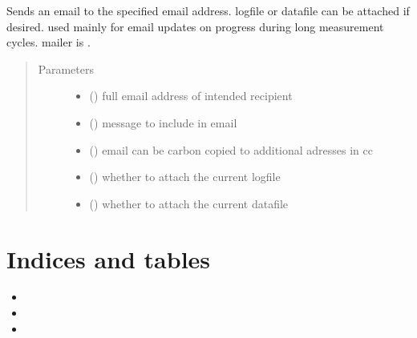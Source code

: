 \documentclass[letterpaper,10pt,english]{sphinxmanual}
\begin{document}
\begin{fulllineitems}
\label{\detokenize{utils:utils.send_email}}
Sends an email to the specified email address. logfile or datafile can
be attached if desired. used mainly for email updates on progress during
long measurement cycles. mailer is .
\begin{quote}\begin{description}
\item[{Parameters}] \leavevmode\begin{itemize}
\item {} 
 () \textendash{} full email address of intended recipient

\item {} 
 () \textendash{} message to include in email

\item {} 
 (\sphinxstyleliteralemphasis{\sphinxupquote{,}}) \textendash{} email can be carbon copied to additional adresses in cc

\item {} 
 () \textendash{} whether to attach the current logfile

\item {} 
 () \textendash{} whether to attach the current datafile

\end{itemize}

\end{description}\end{quote}

\end{fulllineitems}



\chapter{Indices and tables}
\label{\detokenize{index:indices-and-tables}}\begin{itemize}
\item {} 

\item {} 

\item {} 

\end{itemize}
\end{document}
